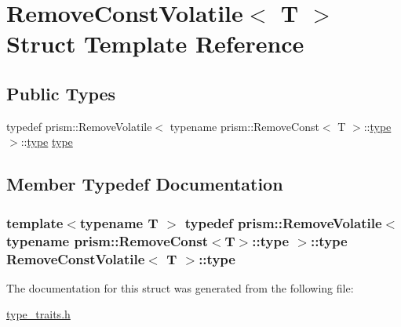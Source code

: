 \hypertarget{struct_remove_const_volatile}{}\section{Remove\+Const\+Volatile$<$ T $>$ Struct Template Reference}
\label{struct_remove_const_volatile}
\subsection*{Public Types}
\begin{DoxyCompactItemize}
\item 
typedef prism\+::\+Remove\+Volatile$<$ typename prism\+::\+Remove\+Const$<$ T $>$\+::\hyperlink{struct_remove_const_volatile_a53b416a12c266794cf8b33baf2ae0f45}{type} $>$\+::\hyperlink{struct_remove_const_volatile_a53b416a12c266794cf8b33baf2ae0f45}{type} \hyperlink{struct_remove_const_volatile_a53b416a12c266794cf8b33baf2ae0f45}{type}
\end{DoxyCompactItemize}


\subsection{Member Typedef Documentation}
\subsubsection[{\texorpdfstring{type}{type}}]{\setlength{\rightskip}{0pt plus 5cm}template$<$typename T $>$ typedef prism\+::\+Remove\+Volatile$<$ typename prism\+::\+Remove\+Const$<$T$>$\+::{\bf type} $>$\+::{\bf type} {\bf Remove\+Const\+Volatile}$<$ T $>$\+::{\bf type}}\hypertarget{struct_remove_const_volatile_a53b416a12c266794cf8b33baf2ae0f45}{}\label{struct_remove_const_volatile_a53b416a12c266794cf8b33baf2ae0f45}


The documentation for this struct was generated from the following file\+:\begin{DoxyCompactItemize}
\item 
\hyperlink{type__traits_8h}{type\+\_\+traits.\+h}\end{DoxyCompactItemize}
